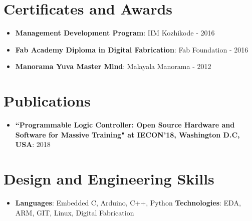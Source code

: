 \documentclass[a4paper,10pt]{article}
\newcommand{\resumeItem}[2]{
  \item\small{
    \textbf{#1}{: #2 \vspace{-2pt}}
  }
}
\newcommand{\resumeSubItem}[2]{\resumeItem{#1}{#2}\vspace{-4pt}}
\newcommand{\resumeSubHeadingListStart}{\begin{itemize}[leftmargin=*]}
\newcommand{\resumeSubHeadingListEnd}{\end{itemize}}
\begin{document}
\section{Certificates and Awards}
  \resumeSubHeadingListStart
    \resumeSubItem{Management Development Program}{IIM Kozhikode - 2016}
    \resumeSubItem{Fab Academy Diploma in Digital Fabrication}{Fab Foundation - 2016}
    \resumeSubItem{Manorama Yuva Master Mind}{Malayala Manorama - 2012}
  \resumeSubHeadingListEnd

\section{Publications}
  \resumeSubHeadingListStart
    \resumeSubItem{``Programmable Logic Controller: Open Source
Hardware and Software for Massive Training" at IECON'18, Washington D.C, USA}{2018}
  \resumeSubHeadingListEnd


\section{Design and Engineering Skills}
 \resumeSubHeadingListStart
   \item{
     \textbf{Languages}{: Embedded C, Arduino, C++, Python}
     \hfill
     \textbf{Technologies}{: EDA, ARM, GIT, Linux, Digital Fabrication}
   }
 \resumeSubHeadingListEnd


\end{document}
